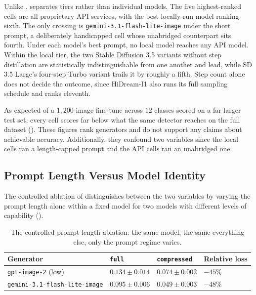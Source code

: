 Unlike ,  separates tiers rather than individual models. The five highest-ranked cells are all proprietary API services, with the best locally-run model ranking sixth. The only crossing is \texttt{gemini-3.1-flash-lite-image} under the short prompt, a deliberately handicapped cell whose unabridged counterpart sits fourth. Under each model's best prompt, no local model reaches any API model. Within the local tier, the two Stable Diffusion 3.5 variants without step distillation are statistically indistinguishable from one another and lead, while SD 3.5 Large's four-step Turbo variant trails it by roughly a fifth. Step count alone does not decide the outcome, since HiDream-I1 also runs its full sampling schedule and ranks eleventh.

As expected of a $1{,}200$-image fine-tune across $12$ classes scored on a far larger test set, every cell scores far below what the same detector reaches on the full dataset (). These figures rank generators and do not support any claims about achievable accuracy. Additionally, they confound two variables since the local cells ran a length-capped prompt and the API cells ran an unabridged one.

\subsection{Prompt Length Versus Model Identity}\label{sec:results_prompt_length}

The controlled ablation of  distinguishes between the two variables by varying the prompt length alone within a fixed model for two models with different levels of capability ().

\begin{table}[htbp]
\centering
\caption[Prompt-length ablation, tabulated]{The controlled prompt-length ablation: the same model, the same everything else, only the prompt regime varies.}
\label{tab:prompt-length-ablation}
\begin{tabular}{@{}llll@{}}
\toprule
Generator & \texttt{full} & \texttt{compressed} & Relative loss \\
\midrule
\texttt{gpt-image-2} (low) & $0.134 \pm 0.014$ & $0.074 \pm 0.002$ & $-45\%$ \\
\texttt{gemini-3.1-flash-lite-image} & $0.095 \pm 0.006$ & $0.049 \pm 0.003$ & $-48\%$ \\
\bottomrule
\end{tabular}
\end{table}

